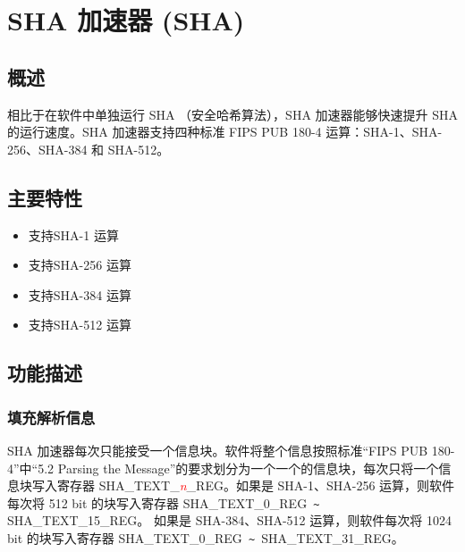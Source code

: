\documentclass[main\_\_CN.tex]{subfiles}
\begin{document}
\setchineseformatting


\ifglobal
\else
    \listoftodos
    {\let\clearpage\relax \listofdonetodos}
    \tableofcontents
\fi



\hypertarget{sha}{}
\chapter{SHA 加速器 (SHA)}
\label{mod:sha}


\section{概述}
相比于在软件中单独运行 SHA （安全哈希算法），SHA 加速器能够快速提升 SHA 的运行速度。SHA 加速器支持四种标准 FIPS PUB 180-4 运算：SHA-1、SHA-256、SHA-384 和 SHA-512。


\section{主要特性}

\begin{itemize}
    \item 支持SHA-1 运算
    \item 支持SHA-256 运算
    \item 支持SHA-384 运算
    \item 支持SHA-512 运算
\end{itemize}


\section{功能描述}



\subsection{填充解析信息}

SHA 加速器每次只能接受一个信息块。软件将整个信息按照标准“FIPS PUB 180-4”中“5.2 Parsing the Message”的要求划分为一个一个的信息块，每次只将一个信息块写入寄存器 SHA\_TEXT\_\textcolor{red}{\it{n}}\_REG。如果是 SHA-1、SHA-256 运算，则软件每次将 512 bit 的块写入寄存器 SHA\_TEXT\_0\_REG\verb+ ~ +SHA\_TEXT\_15\_REG。
如果是 SHA-384、SHA-512 运算，则软件每次将 1024 bit 的块写入寄存器 SHA\_TEXT\_0\_REG\verb+ ~ +SHA\_TEXT\_31\_REG。
\end{document}
